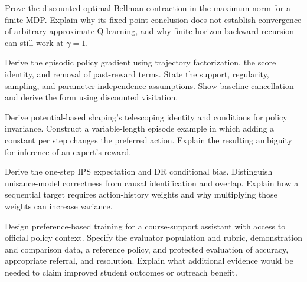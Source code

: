 \clearpage
\begin{challengeexercises}
\item {}Prove the discounted optimal Bellman contraction in the maximum norm for a finite MDP. Explain why its fixed-point conclusion does not establish convergence of arbitrary approximate Q-learning, and why finite-horizon backward recursion can still work at $\gamma=1$.
\item \begin{minipage}[t]{\linewidth}Derive the episodic policy gradient using trajectory factorization, the score identity, and removal of past-reward terms. State the support, regularity, sampling, and parameter-independence assumptions. Show baseline cancellation and derive the form using discounted visitation.\end{minipage}
\item {}Derive potential-based shaping's telescoping identity and conditions for policy invariance. Construct a variable-length episode example in which adding a constant per step changes the preferred action. Explain the resulting ambiguity for inference of an expert's reward.
\item {}Derive the one-step IPS expectation and DR conditional bias. Distinguish nuisance-model correctness from causal identification and overlap. Explain how a sequential target requires action-history weights and why multiplying those weights can increase variance.
\item {}Design preference-based training for a course-support assistant with access to official policy context. Specify the evaluator population and rubric, demonstration and comparison data, a reference policy, and protected evaluation of accuracy, appropriate referral, and resolution. Explain what additional evidence would be needed to claim improved student outcomes or outreach benefit.
\end{challengeexercises}
\clearpage
\begingroup\pagestyle{empty}\cleardoublepage\endgroup
\endgroup
